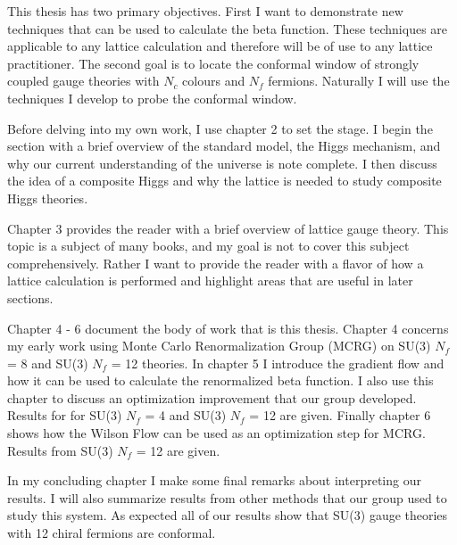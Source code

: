
This thesis has two primary objectives.
First I want to demonstrate new techniques that can be used to calculate the beta function.
These techniques are applicable to any lattice calculation and therefore will be of use to any lattice practitioner.
The second goal is to locate the conformal window of strongly coupled gauge theories with $N_c$ colours and $N_f$ fermions.
Naturally I will use the techniques I develop to probe the conformal window.

Before delving into my own work, I use chapter 2 to set the stage.
I begin the section with a brief overview of the standard model, the Higgs mechanism, and why our current understanding of the universe is note complete.
I then discuss the idea of a composite Higgs and why the lattice is needed to study composite Higgs theories.

Chapter 3 provides the reader with a brief overview of lattice gauge theory.  
This topic is a subject of many books, and my goal is not to cover this subject comprehensively.
Rather I want to provide the reader with a flavor of how a lattice calculation is performed and highlight areas that are useful in later sections.

Chapter 4 - 6 document the body of work that is this thesis.
Chapter 4 concerns my early work using Monte Carlo Renormalization Group (MCRG) on SU(3) $N_f$ = 8 and SU(3) $N_f$ = 12 theories.
In chapter 5 I introduce the gradient flow and how it can be used to calculate the renormalized beta function.
I also use this chapter to discuss an optimization improvement that our group developed.
Results for for SU(3) $N_f$ = 4 and SU(3) $N_f$ = 12 are given.
Finally chapter 6 shows how the Wilson Flow can be used as an optimization step for MCRG.
Results from SU(3) $N_f$ = 12 are given.

In my concluding chapter I make some final remarks about interpreting our results.
I will also summarize results from other methods that our group used to study this system.
As expected all of our results show that SU(3) gauge theories with 12 chiral fermions are conformal.
